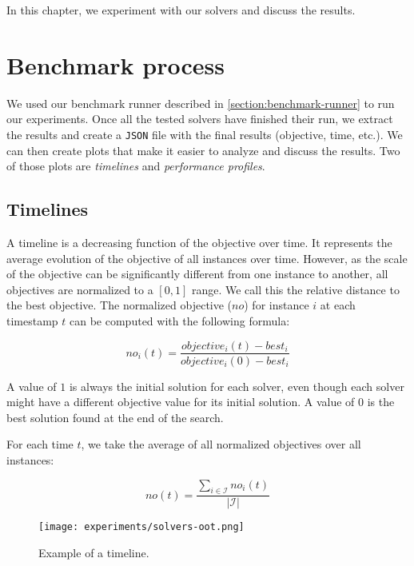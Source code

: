 \documentclass[../../thesis.tex]{subfiles}
\begin{document}
In this chapter, we experiment with our solvers and discuss the results. 

\section{Benchmark process}

We used our benchmark runner described in \autoref{section:benchmark-runner} to run our experiments.
Once all the tested solvers have finished their run, we extract the results and create a \texttt{JSON} file 
with the final results (objective, time, etc.). We can then create plots that make it 
easier to analyze and discuss the results. Two of those plots are \emph{timelines} and \emph{performance profiles}.

\subsection{Timelines}

A timeline is a decreasing function of the objective over time. 
It represents the average evolution of the objective of all instances over time.
However, as the scale of the objective can be 
significantly different from one instance to another, all objectives are normalized to a $[0, 1]$ range.
We call this the relative distance to the best objective. 
The normalized objective ($no$) for instance $i$ at each timestamp $t$ can 
be computed with the following formula:

\begin{equation*}
  no_i(t) = \frac{objective_i(t) - best_i}{objective_i(0) - best_i}
\end{equation*}

A value of $1$ is always the initial solution for each solver, even though each solver might have a different objective value for its initial solution.
A value of $0$ is the best solution found at the end of the search. 

For each time $t$, we take the average of all normalized objectives over all instances:


\begin{equation*}
   no(t) = \frac{\sum_{i \in \mathcal{I}} no_{i}(t)}{|\mathcal{I}|}
\end{equation*}



\begin{figure}
  \centering
  \texttt{[image: experiments/solvers-oot.png]}
  \caption{Example of a timeline.}
  \label{timeline-example}
\end{figure}
\end{document}
